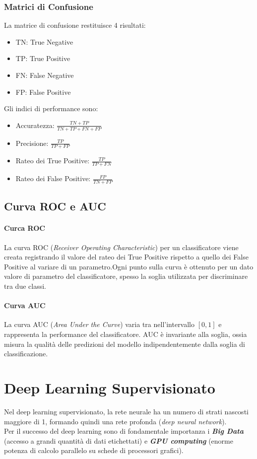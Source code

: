 \subsubsection{Matrici di Confusione}
La matrice di confusione restituisce 4 risultati:
\begin{itemize}
    \item TN: True Negative
    \item TP: True Positive
    \item FN: False Negative
    \item FP: False Positive
\end{itemize}
Gli indici di performance sono:
\begin{itemize}
    \item Accuratezza: \(\frac{TN+TP}{TN+TP+FN+FP}\)
    \item Precisione: \(\frac{TP}{TP+FP}\)
    \item Rateo dei True Positive: \(\frac{TP}{TP+FN}\)
    \item Rateo dei False Positive: \(\frac{FP}{TN+FP}\)
\end{itemize}

\subsection{Curva ROC e AUC}
\paragraph{Curca ROC} La curva ROC (\textit{Receiver Operating Characteristic}) per un classificatore viene creata registrando il valore del rateo dei True Positive rispetto a quello dei False Positive al variare di un parametro.Ogni punto sulla curva è ottenuto per un dato valore di parametro del classificatore, spesso la soglia utilizzata per discriminare tra due classi.
\paragraph{Curva AUC} La curva AUC (\textit{Area Under the Curve}) varia tra nell'intervallo \([0,1]\) e rappresenta la performance del classificatore. AUC è invariante alla soglia, ossia misura la qualità delle predizioni del modello indipendentemente dalla soglia di classificazione.

\newpage
\section{Deep Learning Supervisionato}
Nel deep learning supervisionato, la rete neurale ha un numero di strati nascosti maggiore di 1, formando quindi una rete profonda (\textit{deep neural network}).\\
Per il successo del deep learning sono di fondamentale importanza i \textbf{\textit{Big Data}} (accesso a grandi quantità di dati etichettati) e \textbf{\textit{GPU computing}} (enorme potenza di calcolo parallelo su schede di processori grafici).
